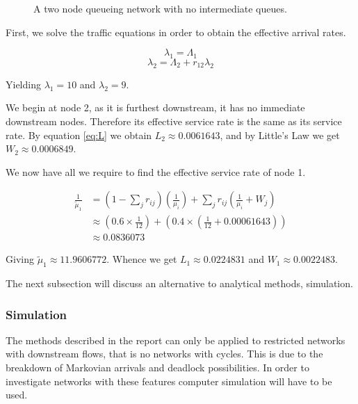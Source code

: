 \documentclass{article}
\begin{document}
\begin{figure}[H]
    
    \caption{A two node queueing network with no intermediate queues.}
    \label{fig:approxnet}
\end{figure}

First, we solve the traffic equations in order to obtain the effective arrival rates.

\begin{equation*}
    \lambda_1 = \Lambda_1
\end{equation*}
\begin{equation*}
    \lambda_2 = \Lambda_2 + r_{12} \lambda_2
\end{equation*}

Yielding $\lambda_1 = 10$ and $\lambda_2 = 9$.

We begin at node 2, as it is furthest downstream, it has no immediate downstream nodes.
Therefore its effective service rate is the same as its service rate.
By equation \eqref{eq:L} we obtain $L_2 \approx 0.0061643$, and by Little's Law we get $W_2 \approx 0.0006849$.

We now have all we require to find the effective service rate of node 1.

\begin{equation*}
    \begin{split}
    \frac{1}{\tilde{\mu}_1} & = \left( 1 - \sum_j r_{ij} \right) \left( \frac{1}{\mu_i} \right) + \sum_j r_{ij} \left( \frac{1}{\mu_i} + W_j \right) \\
    & \approx \left( 0.6 \times \frac{1}{12} \right) + \left( 0.4 \times \left(
    \frac{1}{12} + 0.00061643 \right) \right) \\ %
    & \approx 0.0836073
    \end{split}
\end{equation*}

Giving $\tilde{\mu}_1 \approx 11.9606772$.
Whence we get $L_1 \approx 0.0224831$ and $W_1 \approx 0.0022483$.

The next subsection will discuss an alternative to analytical methods, simulation.

\subsubsection{Simulation}
The methods described in the report can only be applied to restricted networks with downstream flows, that is no networks with cycles.
This is due to the breakdown of Markovian arrivals and deadlock possibilities.
In order to investigate networks with these features computer simulation will have to be used.
\end{document}

